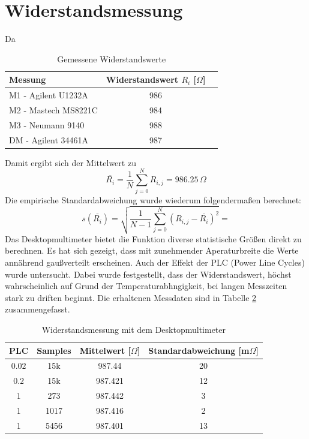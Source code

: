 \section{Widerstandsmessung}
Da 
\begin{table}[h]
	\centering
	\begin{tabular}{|l|c|c|}
	\hline 
	Messung & Widerstandswert $R_i$ [$\Omega$]\\ 
	\hline 
	M1 - Agilent U1232A & 986		\\ 
	\hline 
	M2 - Mastech MS8221C & 984		\\ 
	\hline 
	M3 - Neumann 9140 & 988		\\ 
	\hline 
	DM - Agilent 34461A & 987		\\ 
	\hline 
	\end{tabular}
	\caption{Gemessene Widerstandswerte}
	\label{tb:widerstandswerte}
\end{table} \noindent
Damit ergibt sich der Mittelwert zu
\begin{equation}
	\overline{R_i} = \frac{1}{N} \sum\limits_{j=0}^N R_{i,j} = 986.25\, \Omega
	\label{eq:mittelw}
\end{equation}
Die empirische Standardabweichung wurde wiederum folgendermaßen berechnet:
\begin{equation}
	s(\overline{R_i}) = \sqrt{\frac{1}{N-1} \sum\limits_{j=0}^N (R_{i,j} - \overline{R_i})^2}= 
	\label{eq:stdabw}
\end{equation}
Das Desktopmultimeter bietet die Funktion diverse statistische Größen direkt zu berechnen. Es hat sich gezeigt, dass mit zunehmender Aperaturbreite die Werte annährend gaußverteilt erscheinen. Auch der Effekt der PLC (Power Line Cycles) wurde untersucht. Dabei wurde festgestellt, dass der Widerstandswert, höchst wahrscheinlich auf Grund der Temperaturabhngigkeit, bei langen Messzeiten stark zu driften beginnt. Die erhaltenen Messdaten sind in Tabelle \ref{tb:widerstand_dm} zusammengefasst.
\begin{table}[h]
	\centering
	\begin{tabular}{|c|c|c|c|}
	\hline 
	PLC & Samples & Mittelwert [$\Omega$] & Standardabweichung [m$\Omega$] \\ 
	\hline 
	$0.02$ & 15k & 987.44 & 20 \\ 
	\hline 
	$0.2$ & 15k & 987.421 & 12 \\ 
	\hline 
	$1$ & 273 & 987.442 & 3 \\ 
	\hline 
	1 & 1017 & 987.416 & 2 \\ 
	\hline 
	1 & 5456 & 987.401 & 13 \\ 
	\hline 
	\end{tabular}
	\caption{Widerstandsmessung mit dem Desktopmultimeter}
	\label{tb:widerstand_dm}
\end{table}

